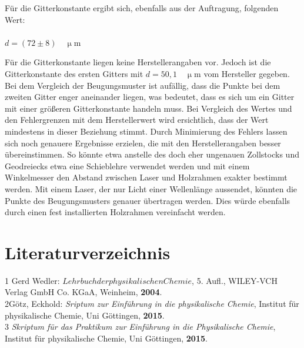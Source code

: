 \documentclass[12pt,a4paper,titlepage,headinclude,bibtotoc]{scrartcl}
\begin{document}
Für die Gitterkonstante ergibt sich, ebenfalls aus der Auftragung, folgenden Wert:\\\\
\centering
$ d = (72 \pm 8) \quad \mathrm{\upmu m} $\\

\begin{flushleft}
Für die Gitterkonstante liegen keine Herstellerangaben vor. Jedoch ist die Gitterkonstante des ersten Gitters mit $d = 50,1 \quad \mathrm{\upmu m} $ vom Hersteller gegeben. Bei dem Vergleich der Beugungsmuster ist aufällig, dass die Punkte bei dem zweiten Gitter enger aneinander liegen, was bedeutet, dass es sich um ein Gitter mit einer größeren Gitterkonstante handeln muss. Bei Vergleich des Wertes und den Fehlergrenzen mit dem Herstellerwert wird ersichtlich, dass der Wert mindestens in dieser Beziehung stimmt.
Durch Minimierung des Fehlers lassen sich noch genauere Ergebnisse erzielen, die mit den Herstellerangaben besser übereinstimmen. So könnte etwa anstelle des doch eher ungenauen Zollstocks und Geodreiecks etwa eine Schieblehre verwendet werden und mit einem Winkelmesser den Abstand zwischen Laser und Holzrahmen exakter bestimmt werden. Mit einem Laser, der nur Licht einer Wellenlänge aussendet, könnten die Punkte des Beugungsmusters genauer übertragen werden. Dies würde ebenfalls durch einen fest installierten Holzrahmen vereinfacht werden.
\end{flushleft}

\section{Literaturverzeichnis}
\begin{flushleft}
1 \quad Gerd Wedler: $Lehrbuch der physikalischen Chemie$, 5. Aufl., WILEY-VCH Verlag GmbH Co. KGaA, Weinheim, \textbf{2004}.\\
\vspace{0,5 cm}
2\quad Götz, Eckhold: \emph{Sriptum zur Einführung in die physikalische Chemie}, Institut für physikalische Chemie, Uni Göttingen, \textbf{2015}.\\
\vspace{0,5 cm}
3 \quad \emph{Skriptum für das Praktikum zur Einführung in die Physikalische Chemie}, Institut für physikalische Chemie, Uni Göttingen, \textbf{2015}.\\
\end{flushleft}
\end{document}
